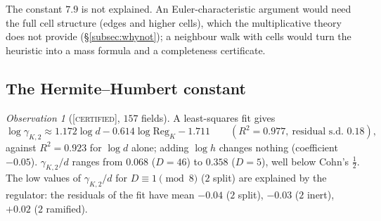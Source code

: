 \documentclass[11pt]{amsart}
\theoremstyle{definition}
\theoremstyle{remark}
\newtheorem{observation}[theorem]{Observation}
\newcommand{\Reg}{\mathrm{Reg}_K}
\newcommand{\gK}{\gamma_{K,2}}
\newcommand{\CERT}{\textsc{[certified]}}
\begin{document}
The constant $7.9$ is not explained.  An Euler-characteristic argument would need the full cell
structure (edges and higher cells), which the multiplicative theory does not provide
(\S\ref{subsec:whynot}); a neighbour walk with cells would turn the heuristic into a mass
formula and a completeness certificate.

\subsection{The Hermite--Humbert constant}\label{subsec:gamma}

\begin{observation}[\CERT, $157$ fields]\label{obs:gamma}
A least-squares fit gives
\[
\log\gK\approx 1.172\log d-0.614\log\Reg-1.711\qquad(R^2=0.977,\ \text{residual s.d. } 0.18),
\]
against $R^2=0.923$ for $\log d$ alone; adding $\log h$ changes nothing (coefficient $-0.05$).
$\gK/d$ ranges from $0.068$ ($D=46$) to $0.358$ ($D=5$), well below Cohn's $\tfrac12$.  The
low values of $\gK/d$ for $D\equiv1\pmod8$ ($2$ split) are explained by the regulator: the
residuals of the fit have mean $-0.04$ ($2$ split), $-0.03$ ($2$ inert), $+0.02$ ($2$
ramified).
\end{observation}
\end{document}
